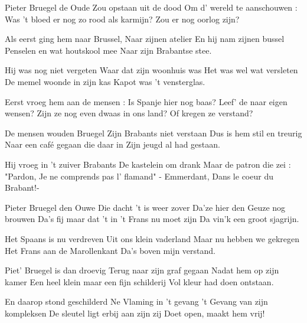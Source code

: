 \footnotemark [
ititle={Pieter Bruegel in Brussel}]


\beginverse
Pieter Bruegel de Oude
Zou opstaan uit de dood
Om d' wereld te aanschouwen :
Was 't bloed er nog zo rood als karmijn?
Zou er nog oorlog zijn?
\endverse

\beginverse
Als eerst ging hem naar Brussel,
Naar zijnen atelier
En hij nam zijnen bussel
Penselen en wat houtskool mee
Naar zijn Brabantse stee.
\endverse

\beginverse
Hij was nog niet vergeten
Waar dat zijn woonhuis was
Het was wel wat versleten
De memel woonde in zijn kas
Kapot was 't vensterglas.
\endverse

\beginverse
Eerst vroeg hem aan de mensen :
Is Spanje hier nog baas?
Leef' de naar eigen wensen?
Zijn ze nog even dwaas in ons land?
Of kregen ze verstand?
\endverse

\beginverse
De mensen wouden Bruegel
Zijn Brabants niet verstaan
Dus is hem stil en treurig
Naar een café gegaan die daar in
Zijn jeugd al had gestaan.
\endverse

\beginverse
Hij vroeg in 't zuiver Brabants
De kastelein om drank
Maar de patron die zei : "Pardon,
Je ne comprends pas l' flamand" - Emmerdant,
Dans le coeur du Brabant!-
\endverse

\beginverse
Pieter Bruegel den Ouwe
Die dacht 't is weer zover
Da'ze hier den Geuze nog brouwen
Da's fij maar dat 't in 't Frans nu moet zijn
Da vin'k een groot sjagrijn.
\endverse

\beginverse
Het Spaans is nu verdreven
Uit ons klein vaderland
Maar nu hebben we gekregen
Het Frans aan de Marollenkant
Da's boven mijn verstand.
\endverse

\beginverse
Piet' Bruegel is dan droevig
Terug naar zijn graf gegaan
Nadat hem op zijn kamer
Een heel klein maar een fijn schilderij
Vol kleur had doen ontstaan.
\endverse

\beginverse
En daarop stond geschilderd
Ne Vlaming in 't gevang
't Gevang van zijn kompleksen
De sleutel ligt erbij aan zijn zij
Doet open, maakt hem vrij!
\endverse
\endsong